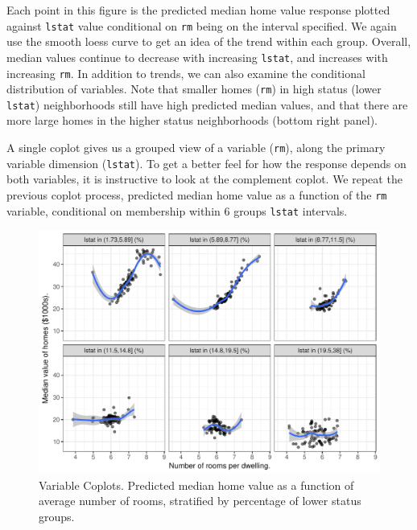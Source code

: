 \documentclass[article]{jss}
\begin{document}
Each point in this figure is the predicted median home value response
plotted against \texttt{lstat} value conditional on \texttt{rm} being on
the interval specified. We again use the smooth loess curve to get an
idea of the trend within each group. Overall, median values continue to
decrease with increasing \texttt{lstat}, and increases with increasing
\texttt{rm}. In addition to trends, we can also examine the conditional
distribution of variables. Note that smaller homes (\texttt{rm}) in high
status (lower \texttt{lstat}) neighborhoods still have high predicted
median values, and that there are more large homes in the higher status
neighborhoods (bottom right panel).

A single coplot gives us a grouped view of a variable (\texttt{rm}),
along the primary variable dimension (\texttt{lstat}). To get a better
feel for how the response depends on both variables, it is instructive
to look at the complement coplot. We repeat the previous coplot process,
predicted median home value as a function of the \texttt{rm} variable,
conditional on membership within 6 groups \texttt{lstat} intervals.

\begin{CodeChunk}
\begin{figure}

{\centering \includegraphics{Regression-rfsrc_files/figure-latex/coplots2-1} 

}

\caption[Variable Coplots]{Variable Coplots. Predicted median home value as a function of average number of rooms, stratified by percentage of lower status groups.}\label{fig:coplots2}
\end{figure}
\end{CodeChunk}
\end{document}
